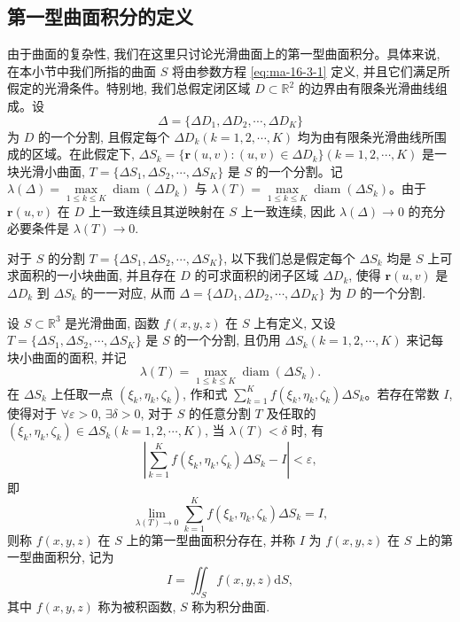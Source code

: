 \subsection{第一型曲面积分的定义}
\label{subsec:ma-16-3-2}

由于曲面的复杂性, 我们在这里只讨论光滑曲面上的第一型曲面积分。具体来说, 在本小节中我们所指的曲面 $S$ 将由参数方程 \eqref{eq:ma-16-3-1} 定义, 并且它们满足所假定的光滑条件。特别地, 我们总假定闭区域 $D\subset\mathbb R^2$ 的边界由有限条光滑曲线组成。设
\[
  \Delta=\{\Delta D_1,\Delta D_2,\cdots,\Delta D_K\}
\]
为 $D$ 的一个分割, 且假定每个 $\Delta D_k(k=1,2,\cdots,K)$ 均为由有限条光滑曲线所围成的区域。在此假定下, $\Delta S_k=\{\boldsymbol r(u,v):(u,v)\in\Delta D_k\}(k=1,2,\cdots,K)$ 是一块光滑小曲面, $T=\{\Delta S_1,\allowbreak\Delta S_2,\allowbreak\cdots,\allowbreak\Delta S_K\}$ 是 $S$ 的一个分割。记 $\lambda(\Delta)=\max\limits_{1\leqslant k\leqslant K}\operatorname{diam}(\Delta D_k)$ 与 $\lambda(T)=\max\limits_{1\leqslant k\leqslant K}\operatorname{diam}(\Delta S_k)$。由于 $\boldsymbol r(u,v)$ 在 $D$ 上一致连续且其逆映射在 $S$ 上一致连续, 因此 $\lambda(\Delta)\to0$ 的充分必要条件是 $\lambda(T)\to0$.

对于 $S$ 的分割 $T=\{\Delta S_1,\Delta S_2,\cdots,\Delta S_K\}$, 以下我们总是假定每个 $\Delta S_k$ 均是 $S$ 上可求面积的一小块曲面, 并且存在 $D$ 的可求面积的闭子区域 $\Delta D_k$, 使得 $\boldsymbol r(u,v)$ 是 $\Delta D_k$ 到 $\Delta S_k$ 的一一对应, 从而 $\Delta=\{\Delta D_1,\Delta D_2,\cdots,\Delta D_K\}$ 为 $D$ 的一个分割.

\begin{definition}\label{definition:ma-16-3-1}
设 $S\subset\mathbb R^3$ 是光滑曲面, 函数 $f(x,y,z)$ 在 $S$ 上有定义, 又设 $T=\{\Delta S_1,\allowbreak\Delta S_2,\allowbreak\cdots,\allowbreak\Delta S_K\}$ 是 $S$ 的一个分割, 且仍用 $\Delta S_k(k=1,2,\cdots,K)$ 来记每块小曲面的面积, 并记
\[
  \lambda(T)=\max_{1\leqslant k\leqslant K}\operatorname{diam}(\Delta S_k).
\]
在 $\Delta S_k$ 上任取一点 $(\xi_k,\eta_k,\zeta_k)$, 作和式 $\sum\limits_{k=1}^K f(\xi_k,\eta_k,\zeta_k)\Delta S_k$。若存在常数 $I$, 使得对于 $\forall\varepsilon>0$, $\exists\delta>0$, 对于 $S$ 的任意分割 $T$ 及任取的 $(\xi_k,\eta_k,\zeta_k)\in\Delta S_k(k=1,2,\cdots,K)$, 当 $\lambda(T)<\delta$ 时, 有
\[
  \left|\sum_{k=1}^K f(\xi_k,\eta_k,\zeta_k)\Delta S_k-I\right|<\varepsilon,
\]
即
\[
  \lim_{\lambda(T)\to0}\sum_{k=1}^K f(\xi_k,\eta_k,\zeta_k)\Delta S_k=I,
\]
则称 $f(x,y,z)$ 在 $S$ 上的第一型曲面积分存在, 并称 $I$ 为 $f(x,y,z)$ 在 $S$ 上的第一型曲面积分, 记为
\[
  I=\iint_S f(x,y,z)\mathrm dS,
\]
其中 $f(x,y,z)$ 称为被积函数, $S$ 称为积分曲面.
\end{definition}

